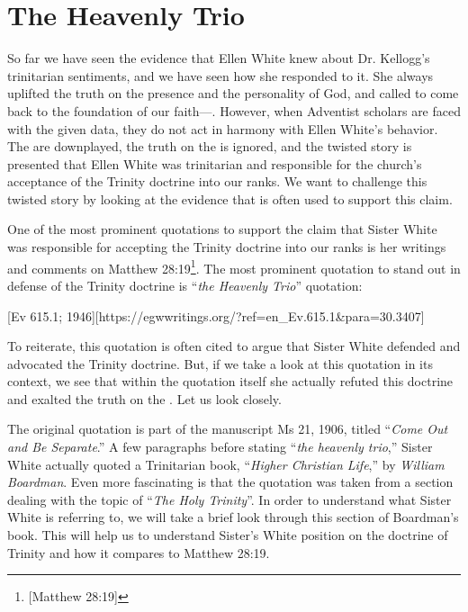 \chapter{The Heavenly Trio}

So far we have seen the evidence that Ellen White knew about Dr. Kellogg's trinitarian sentiments, and we have seen how she responded to it. She always uplifted the truth on the presence and the personality of God, and called to come back to the foundation of our faith—. However, when Adventist scholars are faced with the given data, they do not act in harmony with Ellen White's behavior. The  are downplayed, the truth on the  is ignored, and the twisted story is presented that Ellen White was trinitarian and responsible for the church's acceptance of the Trinity doctrine into our ranks. We want to challenge this twisted story by looking at the evidence that is often used to support this claim.

One of the most prominent quotations to support the claim that Sister White was responsible for accepting the Trinity doctrine into our ranks is her writings and comments on Matthew 28:19\footnote{[Matthew 28:19]}. The most prominent quotation to stand out in defense of the Trinity doctrine is “\textit{the Heavenly Trio}” quotation:

[Ev 615.1; 1946][https://egwwritings.org/?ref=en\_Ev.615.1&para=30.3407]

To reiterate, this quotation is often cited to argue that Sister White defended and advocated the Trinity doctrine. But, if we take a look at this quotation in its context, we see that within the quotation itself she actually refuted this doctrine and exalted the truth on the . Let us look closely. 

The original quotation is part of the manuscript Ms 21, 1906, titled “\textit{Come Out and Be Separate}.” A few paragraphs before stating “\textit{the heavenly trio},” Sister White actually quoted a Trinitarian book, “\textit{Higher Christian Life},” by \textit{William Boardman}. Even more fascinating is that the quotation was taken from a section dealing with the topic of “\textit{The Holy Trinity}”. In order to understand what Sister White is referring to, we will take a brief look through this section of Boardman’s book. This will help us to understand Sister’s White position on the doctrine of Trinity and how it compares to Matthew 28:19.

